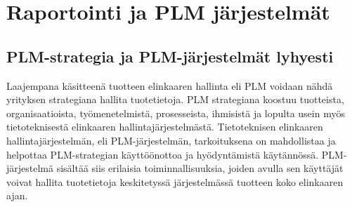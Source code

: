 \chapter{Raportointi ja PLM järjestelmät} \label{Raportointi ja PLM järjestelmät}

\section{PLM-strategia ja PLM-järjestelmät lyhyesti} \label{PLM-strategia ja PLM-järjestelmät lyhyesti}

Laajempana käsitteenä tuotteen elinkaaren hallinta eli PLM voidaan nähdä yrityksen strategiana hallita tuotetietoja. PLM strategiana koostuu tuotteista, organisaatioista, työmenetelmistä, prosesseista, ihmisistä ja lopulta usein myös tietoteknisestä elinkaaren hallintajärjestelmästä. Tietoteknisen elinkaaren hallintajärjestelmän, eli PLM-järjestelmän, tarkoituksena on mahdollistaa ja helpottaa PLM-strategian käyttöönottoa ja hyödyntämistä käytännössä. PLM-järjestelmä sisältää siis erilaisia toiminnallisuuksia, joiden avulla sen käyttäjät voivat hallita tuotetietoja keskitetyssä järjestelmässä tuotteen koko elinkaaren ajan.

